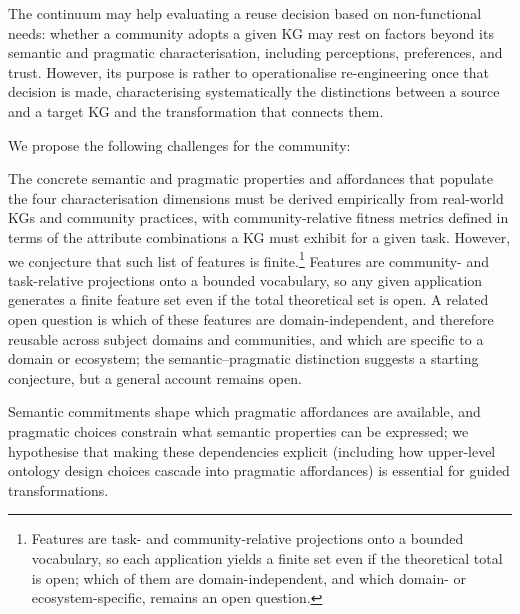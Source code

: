 \documentclass[runningheads]{llncs}
\newenvironment{onlyextended}{\ignorespaces}{\ignorespacesafterend}
\newenvironment{onlyshort}{\ignorespaces}{\ignorespacesafterend}
\begin{document}
\begin{onlyshort}
The continuum may help evaluating a reuse decision based on non-functional needs: whether a community adopts a given KG may rest on factors beyond its semantic and pragmatic characterisation, including perceptions, preferences, and trust.
However, its purpose is rather to operationalise re-engineering once that decision is made, characterising systematically the distinctions between a source and a target KG and the transformation that connects them.
\end{onlyshort}

\noindent We propose the following challenges for the community:

\medskip{}
The concrete semantic and pragmatic properties and 
affordances that populate the four characterisation 
dimensions must be derived empirically from real-world KGs 
and community practices, with community-relative fitness 
metrics defined in terms of the attribute combinations a 
KG must exhibit for a given task.
However, we conjecture that such list of features is finite.\begin{onlyshort}\footnote{Features are task- and community-relative projections onto a bounded vocabulary, so each application yields a finite set even if the theoretical total is open; which of them are domain-independent, and which domain- or ecosystem-specific, remains an open question.}
\end{onlyshort}
\begin{onlyextended}
Features are community- and task-relative projections onto a bounded vocabulary, so any given application generates a finite feature set even if the total theoretical set is open. 
A related open question is which of these features are domain-independent, and therefore reusable across subject domains and communities, and which are specific to a domain or ecosystem; the semantic--pragmatic distinction suggests a starting conjecture, but a general account remains open.
\end{onlyextended}

\smallskip{}
Semantic commitments shape which pragmatic affordances are 
available, and pragmatic choices constrain what semantic 
properties can be expressed; we hypothesise that making these dependencies 
explicit (including how upper-level ontology design choices cascade into pragmatic affordances) is essential for guided transformations.
\end{document}
